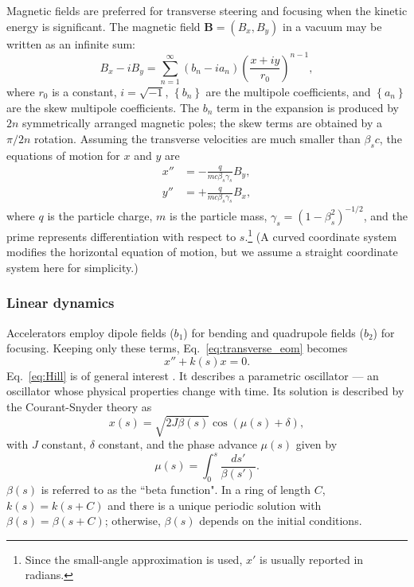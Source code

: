 Magnetic fields are preferred for transverse steering and focusing when the kinetic energy is significant. The magnetic field $\mathbf{B} = (B_x, B_y)$ in a vacuum may be written as an infinite sum:
%
\begin{equation}\label{eq:magnetic_field_expansion}
    B_x - iB_y = \sum_{n = 1}^{\infty}{(b_n - i a_n) \left({\frac{x + i y}{r_0}}\right)^{n - 1}},
\end{equation}
%
where $r_0$ is a constant, $i = \sqrt{-1}$, $\left\{ b_n \right\}$ are the multipole coefficients, and $\left\{ a_n \right\}$ are the skew multipole coefficients. The $b_n$ term in the expansion is produced by $2n$ symmetrically arranged magnetic poles; the skew terms are obtained by a $\pi / 2n$ rotation. Assuming the transverse velocities are much smaller than $\beta_s c$, the equations of motion for $x$ and $y$ are
%
\begin{equation}\label{eq:transverse_eom}
\begin{aligned}
    x'' &= -\frac{q}{m c \beta_s \gamma_s} B_y, \\
    y'' &= +\frac{q}{m c \beta_s \gamma_s} B_x,
\end{aligned}
\end{equation}
%
where $q$ is the particle charge, $m$ is the particle mass, $\gamma_s = (1 - \beta_s^2)^{-1/2}$, and the prime represents differentiation with respect to $s$.\footnote{Since the small-angle approximation is used, $x'$ is usually reported in radians.} (A curved coordinate system modifies the horizontal equation of motion, but we assume a straight coordinate system here for simplicity.)


\subsubsection{Linear dynamics}

 Accelerators employ dipole fields ($b_1$) for bending and quadrupole fields ($b_2$) for focusing. Keeping only these terms, Eq.~\eqref{eq:transverse_eom} becomes
%
 \begin{equation}\label{eq:Hill}
     x'' + k(s)x = 0.
 \end{equation}
%
Eq.~\eqref{eq:Hill} is of general interest \cite{Hill1886, Qin2007}. It describes a parametric oscillator — an oscillator whose physical properties change with time. Its solution is described by the Courant-Snyder theory \cite{Courant1958} as
%
\begin{equation}\label{eq:Hill_solution}
    x(s) = \sqrt{2 J \beta(s)} \cos{\left({\mu(s) + \delta}\right)},
\end{equation}
%
with $J$ constant, $\delta$ constant, and the phase advance $\mu(s)$ given by
%
\begin{equation}
    \mu(s) = \int_{0}^{s}{\frac{ds'}{\beta(s')}}.
\end{equation}
%
$\beta(s)$ is referred to as the ``beta function". In a ring of length $C$, $k(s) = k(s + C)$ and there is a unique periodic solution with $\beta(s) = \beta(s + C)$; otherwise, $\beta(s)$ depends on the initial conditions.


